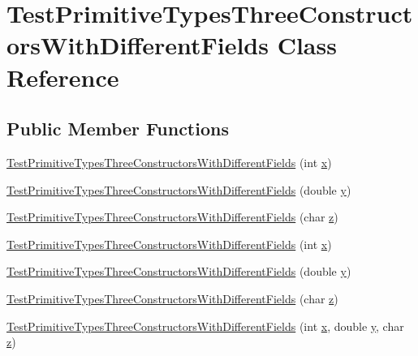 \hypertarget{classTestPrimitiveTypesThreeConstructorsWithDifferentFields}{
\section{TestPrimitiveTypesThreeConstructorsWithDifferentFields Class Reference}
\label{classTestPrimitiveTypesThreeConstructorsWithDifferentFields}
}
\subsection*{Public Member Functions}
\begin{DoxyCompactItemize}
\item 
\hyperlink{classTestPrimitiveTypesThreeConstructorsWithDifferentFields_ad46a5caa83f37dd782c4e2754077ab47}{TestPrimitiveTypesThreeConstructorsWithDifferentFields} (int \hyperlink{classTestPrimitiveTypesThreeConstructorsWithDifferentFields_a252f09fdacfa1783ea30801827076fb1}{x})
\item 
\hyperlink{classTestPrimitiveTypesThreeConstructorsWithDifferentFields_a55d8ba9133e564c0db84389fde8d75a0}{TestPrimitiveTypesThreeConstructorsWithDifferentFields} (double \hyperlink{classTestPrimitiveTypesThreeConstructorsWithDifferentFields_aca6793749b2098bcd3cadd31e71f1080}{y})
\item 
\hyperlink{classTestPrimitiveTypesThreeConstructorsWithDifferentFields_ade958db1464a079b7095412897eb507c}{TestPrimitiveTypesThreeConstructorsWithDifferentFields} (char \hyperlink{classTestPrimitiveTypesThreeConstructorsWithDifferentFields_a112ee7f3b539bf2252e2847b57fa7267}{z})
\item 
\hyperlink{classTestPrimitiveTypesThreeConstructorsWithDifferentFields_ad46a5caa83f37dd782c4e2754077ab47}{TestPrimitiveTypesThreeConstructorsWithDifferentFields} (int \hyperlink{classTestPrimitiveTypesThreeConstructorsWithDifferentFields_a252f09fdacfa1783ea30801827076fb1}{x})
\item 
\hyperlink{classTestPrimitiveTypesThreeConstructorsWithDifferentFields_a55d8ba9133e564c0db84389fde8d75a0}{TestPrimitiveTypesThreeConstructorsWithDifferentFields} (double \hyperlink{classTestPrimitiveTypesThreeConstructorsWithDifferentFields_aca6793749b2098bcd3cadd31e71f1080}{y})
\item 
\hyperlink{classTestPrimitiveTypesThreeConstructorsWithDifferentFields_ade958db1464a079b7095412897eb507c}{TestPrimitiveTypesThreeConstructorsWithDifferentFields} (char \hyperlink{classTestPrimitiveTypesThreeConstructorsWithDifferentFields_a112ee7f3b539bf2252e2847b57fa7267}{z})
\item 
\hyperlink{classTestPrimitiveTypesThreeConstructorsWithDifferentFields_a29631713d67fe3a9a3d074f1900fd306}{TestPrimitiveTypesThreeConstructorsWithDifferentFields} (int \hyperlink{classTestPrimitiveTypesThreeConstructorsWithDifferentFields_a252f09fdacfa1783ea30801827076fb1}{x}, double \hyperlink{classTestPrimitiveTypesThreeConstructorsWithDifferentFields_aca6793749b2098bcd3cadd31e71f1080}{y}, char \hyperlink{classTestPrimitiveTypesThreeConstructorsWithDifferentFields_a112ee7f3b539bf2252e2847b57fa7267}{z})
\end{DoxyCompactItemize}
